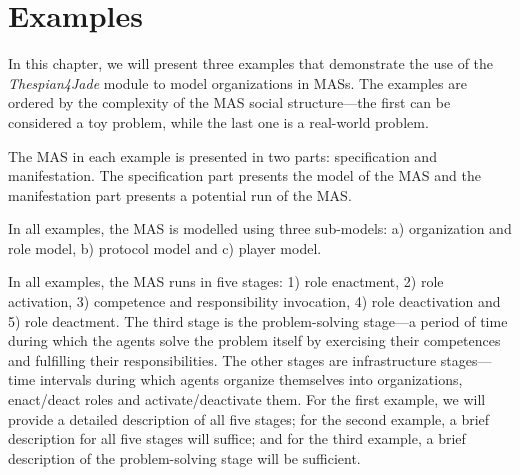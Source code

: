 
\chapter{Examples}

In this chapter, we will present three examples that demonstrate the use of the \textit{Thespian4Jade} module to model organizations in MASs.
The examples are ordered by the complexity of the MAS social structure---the first can be considered a toy problem, while the last one is a real-world problem.

The MAS in each example is presented in two parts: specification and manifestation.
The specification part presents the model of the MAS and the manifestation part presents a potential run of the MAS.

In all examples, the MAS is modelled using three sub-models: a) organization and role model, b) protocol model and c) player model.

In all examples, the MAS runs in five stages: 1) role enactment, 2) role activation, 3) competence and responsibility invocation, 4) role deactivation and 5) role deactment.
The third stage is the problem-solving stage---a period of time during which the agents solve the problem itself by exercising their competences and fulfilling their responsibilities.
The other stages are infrastructure stages---time intervals during which agents organize themselves into organizations, enact/deact roles and activate/deactivate them.
For the first example, we will provide a detailed description of all five stages; for the second example, a brief description for all five stages will suffice; and for the third example, a brief description of the problem-solving stage will be sufficient.

